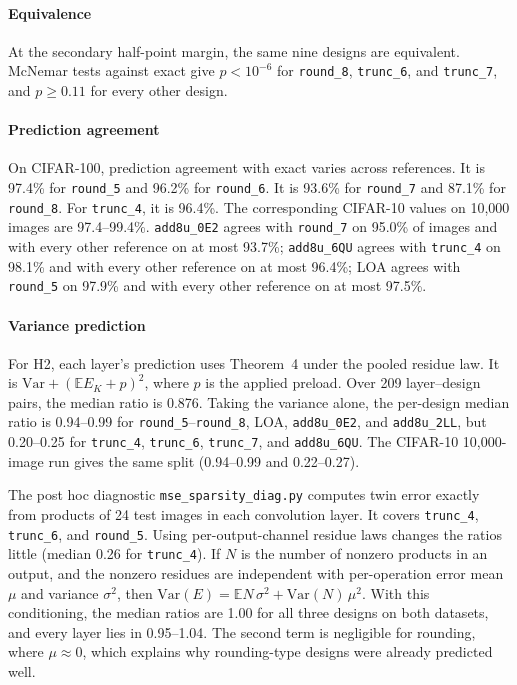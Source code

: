 \documentclass[11pt]{article}
\newcommand{\E}{\mathbb{E}}
\begin{document}
\paragraph{Equivalence}
At the secondary half-point margin, the same nine designs are equivalent.
McNemar tests against exact give $p<10^{-6}$ for \texttt{round\_8},
\texttt{trunc\_6}, and \texttt{trunc\_7}, and $p\ge0.11$ for every other
design.

\paragraph{Prediction agreement}
On CIFAR-100, prediction agreement with exact varies across
references. It is 97.4\% for \texttt{round\_5} and 96.2\% for
\texttt{round\_6}. It is 93.6\% for \texttt{round\_7} and 87.1\%
for \texttt{round\_8}. For \texttt{trunc\_4}, it is 96.4\%.
The corresponding CIFAR-10 values on 10{,}000 images
are 97.4--99.4\%. \texttt{add8u\_0E2} agrees with \texttt{round\_7} on
95.0\% of images and with every other reference on at most 93.7\%;
\texttt{add8u\_6QU} agrees with \texttt{trunc\_4} on 98.1\% and with
every other reference on at most 96.4\%; LOA agrees with \texttt{round\_5}
on 97.9\% and with every other reference on at most 97.5\%.

\paragraph{Variance prediction}
For H2, each layer's prediction uses Theorem~4 under the pooled
residue law. It is $\mathrm{Var}+(\E E_K+p)^2$, where $p$ is the applied
preload. Over 209 layer--design pairs, the median ratio is
0.876. Taking the variance alone, the per-design median ratio is 0.94--0.99
for \texttt{round\_5}--\texttt{round\_8}, LOA, \texttt{add8u\_0E2}, and
\texttt{add8u\_2LL}, but 0.20--0.25 for \texttt{trunc\_4},
\texttt{trunc\_6}, \texttt{trunc\_7}, and \texttt{add8u\_6QU}. The
CIFAR-10 10{,}000-image run gives the same split (0.94--0.99 and
0.22--0.27).

The post hoc diagnostic \texttt{mse\_sparsity\_diag.py} computes twin
error exactly from products of 24 test images in each convolution
layer. It covers \texttt{trunc\_4}, \texttt{trunc\_6}, and
\texttt{round\_5}.
Using per-output-channel residue laws changes the ratios little (median
0.26 for \texttt{trunc\_4}). If $N$ is the number of nonzero products in
an output, and the nonzero residues are independent with per-operation
error mean $\mu$ and variance $\sigma^2$, then
$\mathrm{Var}(E)=\E N\,\sigma^2+\mathrm{Var}(N)\,\mu^2$. With this
conditioning, the median ratios are 1.00 for all three designs on both
datasets, and every layer lies in 0.95--1.04. The second term is negligible
for rounding, where $\mu\approx0$, which explains why rounding-type
designs were already predicted well.
\end{document}
